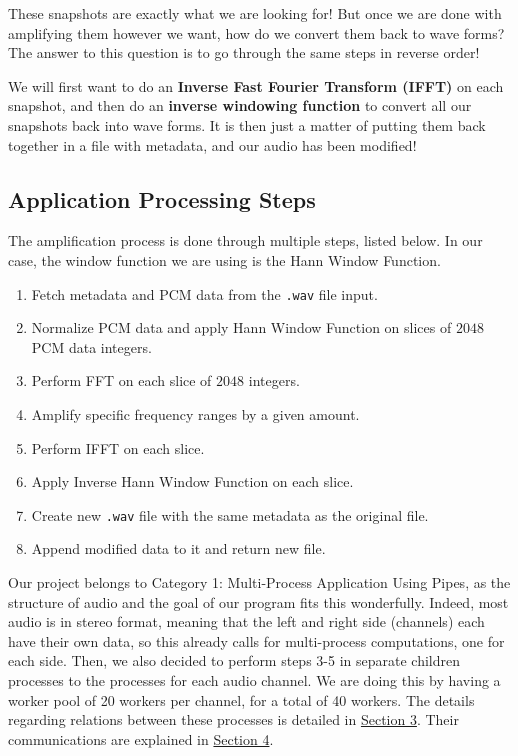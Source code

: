 \documentclass{article}
\begin{document}
These snapshots are exactly what we are looking for! But once we are done with amplifying them however we want, how do we convert them back to wave forms? The answer to this question is to go through the same steps in reverse order!

We will first want to do an \textbf{Inverse Fast Fourier Transform (IFFT)} on each snapshot, and then do an \textbf{inverse windowing function} to convert all our snapshots back into wave forms. It is then just a matter of putting them back together in a file with metadata, and our audio has been modified!

\subsection{Application Processing Steps}\label{steps}

The amplification process is done through multiple steps, listed below. In our case, the window function we are using is the Hann Window Function.

\begin{enumerate}
    \item Fetch metadata and PCM data from the \texttt{.wav} file input.
    \item Normalize PCM data and apply Hann Window Function on slices of $2048$ PCM data integers.
    \item Perform FFT on each slice of $2048$ integers.
    \item Amplify specific frequency ranges by a given amount.
    \item Perform IFFT on each slice.
    \item Apply Inverse Hann Window Function on each slice.
    \item Create new \texttt{.wav} file with the same metadata as the original file.
    \item Append modified data to it and return new file.
\end{enumerate}

Our project belongs to Category 1: Multi-Process Application Using Pipes, as the structure of audio and the goal of our program fits this wonderfully. Indeed, most audio is in stereo format, meaning that the left and right side (channels) each have their own data, so this already calls for multi-process computations, one for each side. Then, we also decided to perform steps 3-5 in separate children processes to the processes for each audio channel. We are doing this by having a worker pool of 20 workers per channel, for a total of 40 workers. The details regarding relations between these processes is detailed in \hyperref[arch]{Section 3}. Their communications are explained in \hyperref[comm]{Section 4}.
\end{document}
